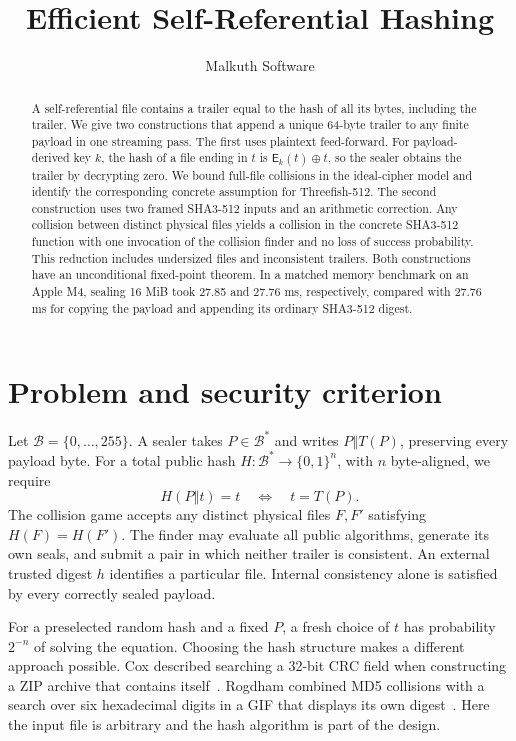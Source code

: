\documentclass[10pt,twocolumn,letterpaper]{article}
\title{\vspace{-2em}\bfseries Efficient Self-Referential Hashing}
\author{\normalsize Malkuth Software}
\date{}
\newcommand{\cat}{\mathbin\Vert}
\newcommand{\xor}{\mathbin\oplus}
\newcommand{\bits}{\{0,1\}}
\newcommand{\B}{\mathcal B}
\newcommand{\E}{\mathsf E}
\begin{document}
\maketitle
\begin{abstract}
A self-referential file contains a trailer equal to the hash of all its bytes, including the trailer. We give two constructions that append a unique 64-byte trailer to any finite payload in one streaming pass. The first uses plaintext feed-forward. For payload-derived key \(k\), the hash of a file ending in \(t\) is \(\E_k(t)\xor t\), so the sealer obtains the trailer by decrypting zero. We bound full-file collisions in the ideal-cipher model and identify the corresponding concrete assumption for Threefish-512. The second construction uses two framed SHA3-512 inputs and an arithmetic correction. Any collision between distinct physical files yields a collision in the concrete SHA3-512 function with one invocation of the collision finder and no loss of success probability. This reduction includes undersized files and inconsistent trailers. Both constructions have an unconditional fixed-point theorem. In a matched memory benchmark on an Apple M4, sealing 16 MiB took 27.85 and 27.76 ms, respectively, compared with 27.76 ms for copying the payload and appending its ordinary SHA3-512 digest.
\end{abstract}

\section{Problem and security criterion}
Let \(\B=\{0,\ldots,255\}\). A sealer takes \(P\in\B^*\) and writes \(P\cat T(P)\), preserving every payload byte. For a total public hash \(H:\B^*\to\bits^n\), with \(n\) byte-aligned, we require
\[
        H(P\cat t)=t \quad\Longleftrightarrow\quad t=T(P).
\]
The collision game accepts any distinct physical files \(F,F'\) satisfying \(H(F)=H(F')\). The finder may evaluate all public algorithms, generate its own seals, and submit a pair in which neither trailer is consistent. An external trusted digest \(h\) identifies a particular file. Internal consistency alone is satisfied by every correctly sealed payload.

For a preselected random hash and a fixed \(P\), a fresh choice of \(t\) has probability \(2^{-n}\) of solving the equation. Choosing the hash structure makes a different approach possible. Cox described searching a 32-bit CRC field when constructing a ZIP archive that contains itself~\cite{cox}. Rogdham combined MD5 collisions with a search over six hexadecimal digits in a GIF that displays its own digest~\cite{gif}. Here the input file is arbitrary and the hash algorithm is part of the design.
\end{document}
